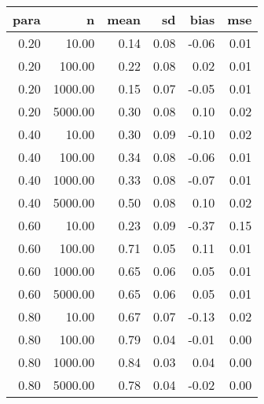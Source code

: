 \begin{table}[ht]
\centering
\begin{tabular}{rrrrrr}
  \hline
para & n & mean & sd & bias & mse \\ 
  \hline
0.20 & 10.00 & 0.14 & 0.08 & -0.06 & 0.01 \\ 
  0.20 & 100.00 & 0.22 & 0.08 & 0.02 & 0.01 \\ 
  0.20 & 1000.00 & 0.15 & 0.07 & -0.05 & 0.01 \\ 
  0.20 & 5000.00 & 0.30 & 0.08 & 0.10 & 0.02 \\ 
  0.40 & 10.00 & 0.30 & 0.09 & -0.10 & 0.02 \\ 
  0.40 & 100.00 & 0.34 & 0.08 & -0.06 & 0.01 \\ 
  0.40 & 1000.00 & 0.33 & 0.08 & -0.07 & 0.01 \\ 
  0.40 & 5000.00 & 0.50 & 0.08 & 0.10 & 0.02 \\ 
  0.60 & 10.00 & 0.23 & 0.09 & -0.37 & 0.15 \\ 
  0.60 & 100.00 & 0.71 & 0.05 & 0.11 & 0.01 \\ 
  0.60 & 1000.00 & 0.65 & 0.06 & 0.05 & 0.01 \\ 
  0.60 & 5000.00 & 0.65 & 0.06 & 0.05 & 0.01 \\ 
  0.80 & 10.00 & 0.67 & 0.07 & -0.13 & 0.02 \\ 
  0.80 & 100.00 & 0.79 & 0.04 & -0.01 & 0.00 \\ 
  0.80 & 1000.00 & 0.84 & 0.03 & 0.04 & 0.00 \\ 
  0.80 & 5000.00 & 0.78 & 0.04 & -0.02 & 0.00 \\ 
   \hline
\end{tabular}
\end{table}
